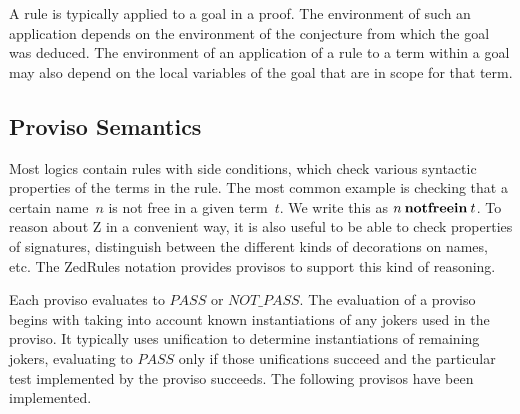 \documentclass{entcs}
\begin{document}
A rule is typically applied to a goal in a proof.
The environment of such an application
depends on the environment of the conjecture from which the goal was deduced.
The environment of an application of a rule to a term within a goal
may also depend on the local variables of the goal
that are in scope for that term.

\subsection{Proviso Semantics}

Most logics contain rules with side conditions, which check various
syntactic properties of the terms in the rule.  The most common
example is checking that a certain name~$n$ is not free in a given
term~$t$.  We write this as $n \mathbin{\mathop{\mathstrut{\mbox{\textbf{notfreein}}}}\nolimits} t$.  To reason about Z in a
convenient way, it is also useful to be able to check properties of
signatures, distinguish between the different kinds of decorations on
names, etc.
%
The ZedRules notation provides provisos to support this kind of
reasoning.

Each proviso evaluates to $PASS$ or $NOT\_PASS$.
The evaluation of a proviso begins with
taking into account known instantiations of any jokers used in the proviso.
It typically uses unification to determine instantiations of remaining jokers,
evaluating to $PASS$ only if those unifications succeed
and the particular test implemented by the proviso succeeds.
The following provisos have been implemented.
\end{document}
